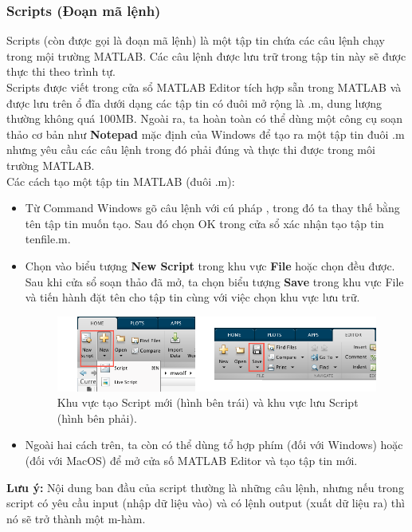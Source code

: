 \documentclass[12pt,a4paper]{article}
\begin{document}
\subsubsection{Scripts (Đoạn mã lệnh)}
Scripts (còn được gọi là đoạn mã lệnh) là một tập tin chứa các câu lệnh chạy trong mội trường MATLAB. Các câu lệnh được lưu trữ trong tập tin này sẽ được thực thi theo trình tự.\\
Scripts được viết trong cửa sổ MATLAB Editor tích hợp sẵn trong MATLAB và được lưu trên ổ đĩa dưới dạng các tập tin có đuôi mở rộng là .m, dung lượng thường không quá 100MB. Ngoài ra, ta hoàn toàn có thể dùng một công cụ soạn thảo cơ bản như \textbf{Notepad} mặc định của Windows để tạo ra một tập tin đuôi .m nhưng yêu cầu các câu lệnh trong đó phải đúng và thực thi được trong môi trường MATLAB.\\
Các cách tạo một tập tin MATLAB (đuôi .m):
\begin{itemize}
	\item Từ Command Windows gõ câu lệnh với cú pháp , trong đó ta thay thế  bằng tên tập tin muốn tạo. Sau đó chọn OK trong cửa sổ xác nhận tạo tập tin tenfile.m.
	\item Chọn vào biểu tượng \textbf{New Script} trong khu vực \textbf{File} hoặc chọn  đều được. Sau khi cửa sổ soạn thảo đã mở, ta chọn biểu tượng \textbf{Save} trong khu vực File và tiến hành đặt tên cho tập tin cùng với việc chọn khu vực lưu trữ.
\begin{center}
	\begin{figure}[htp]
		\begin{center}
		\includegraphics[scale=.5]{hinhtieuluan/pic5}
		\end{center}
		\caption{Khu vực tạo Script mới (hình bên trái) và khu vực lưu Script (hình bên phải).}
		\label{refhinh5}
	\end{figure}
\end{center}
	\item Ngoài hai cách trên, ta còn có thể dùng tổ hợp phím  (đối với Windows) hoặc  (đối với MacOS) để mở cửa số MATLAB Editor và tạo tập tin mới.
\end{itemize}
\textbf{Lưu ý:} Nội dung ban đầu của script thường là những câu lệnh, nhưng nếu trong script có yêu cầu input (nhập dữ liệu vào) và có lệnh output (xuất dữ liệu ra) thì nó sẽ trở thành một m-hàm. 
\end{document}
